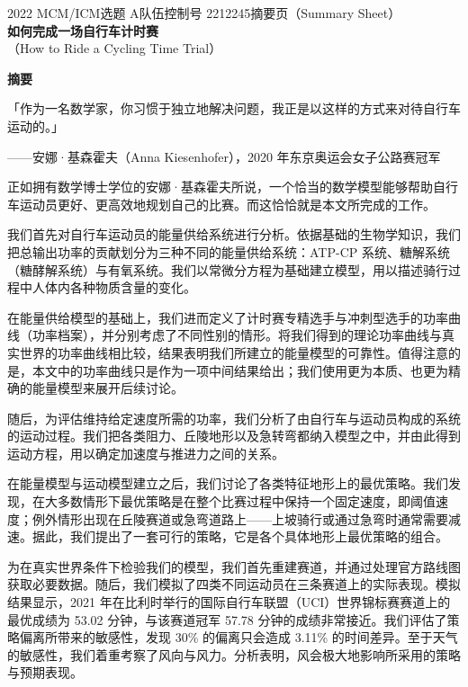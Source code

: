 \documentclass[11pt,a4paper]{ctexart}
\begin{document}
\thispagestyle{empty}
\begin{center}
{\small 2022 MCM/ICM\quad 选题 A\quad 队伍控制号 2212245\quad 摘要页（Summary Sheet）}\\[18pt]
{\LARGE\bfseries 如何完成一场自行车计时赛}\\[8pt]
{\large （How to Ride a Cycling Time Trial）}\\[10pt]
\end{center}

\begin{center}
{\large\bfseries 摘\quad 要}
\end{center}

\vspace{6pt}
「作为一名数学家，你习惯于独立地解决问题，我正是以这样的方式来对待自行车运动的。」
\begin{flushright}
——安娜·基森霍夫（Anna Kiesenhofer），2020 年东京奥运会女子公路赛冠军
\end{flushright}

正如拥有数学博士学位的安娜·基森霍夫所说，一个恰当的数学模型能够帮助自行车运动员更好、更高效地规划自己的比赛。而这恰恰就是本文所完成的工作。

我们首先对自行车运动员的能量供给系统进行分析。依据基础的生物学知识，我们把总输出功率的贡献划分为三种不同的能量供给系统：ATP-CP 系统、糖解系统（糖酵解系统）与有氧系统。我们以常微分方程为基础建立模型，用以描述骑行过程中人体内各种物质含量的变化。

在能量供给模型的基础上，我们进而定义了计时赛专精选手与冲刺型选手的功率曲线（功率档案），并分别考虑了不同性别的情形。将我们得到的理论功率曲线与真实世界的功率曲线相比较，结果表明我们所建立的能量模型的可靠性。值得注意的是，本文中的功率曲线只是作为一项中间结果给出；我们使用更为本质、也更为精确的能量模型来展开后续讨论。

随后，为评估维持给定速度所需的功率，我们分析了由自行车与运动员构成的系统的运动过程。我们把各类阻力、丘陵地形以及急转弯都纳入模型之中，并由此得到运动方程，用以确定加速度与推进力之间的关系。

在能量模型与运动模型建立之后，我们讨论了各类特征地形上的最优策略。我们发现，在大多数情形下最优策略是在整个比赛过程中保持一个固定速度，即阈值速度；例外情形出现在丘陵赛道或急弯道路上——上坡骑行或通过急弯时通常需要减速。据此，我们提出了一套可行的策略，它是各个具体地形上最优策略的组合。

为在真实世界条件下检验我们的模型，我们首先重建赛道，并通过处理官方路线图获取必要数据。随后，我们模拟了四类不同运动员在三条赛道上的实际表现。模拟结果显示，2021 年在比利时举行的国际自行车联盟（UCI）世界锦标赛赛道上的最优成绩为 53.02 分钟，与该赛道冠军 57.78 分钟的成绩非常接近。我们评估了策略偏离所带来的敏感性，发现 30\% 的偏离只会造成 3.11\% 的时间差异。至于天气的敏感性，我们着重考察了风向与风力。分析表明，风会极大地影响所采用的策略与预期表现。
\end{document}
